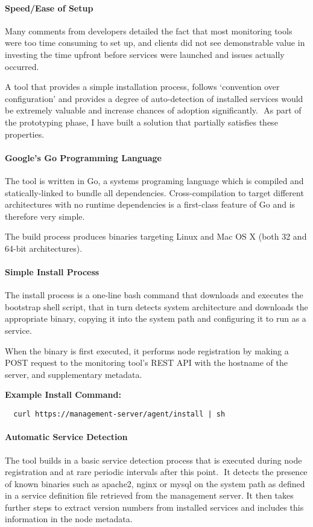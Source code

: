 \documentclass{cshonours}
\begin{document}
\paragraph{Speed/Ease of Setup} Many comments from developers detailed the fact that most monitoring tools were too time consuming to set up, and clients did not see demonstrable value in investing the time upfront before services were launched and issues actually occurred. 

A tool that provides a simple installation process, follows ‘convention over configuration’ and provides a degree of auto-detection of installed services would be extremely valuable and increase chances of adoption significantly.
 As part of the prototyping phase, I have built a solution that partially satisfies these properties.

\paragraph{Google's Go Programming Language} The tool is written in Go, a systems programing language which is compiled and statically-linked to bundle all dependencies. Cross-compilation to target different architectures with no runtime dependencies is a first-class feature of Go and is therefore very simple.

The build process produces binaries targeting Linux and Mac OS X (both 32 and 64-bit architectures). 

\paragraph{Simple Install Process} The install process is a one-line bash command that downloads and executes the bootstrap shell script, that in turn detects system architecture and downloads the appropriate binary, copying it into the system path and configuring it to run as a service.

When the binary is first executed, it performs node registration by making a POST request to the monitoring tool’s REST API with the hostname of the server, and supplementary metadata.

\textbf{Example Install Command:}
\begin{verbatim}
  curl https://management-server/agent/install | sh
\end{verbatim}

\paragraph{Automatic Service Detection} The tool builds in a basic service detection process that is executed during node registration and at rare periodic intervals after this point. 
 It detects the presence of known binaries such as apache2, nginx or mysql on the system path as defined in a service definition file retrieved from the management server. It then takes further steps to extract version numbers from installed services and includes this information in the node metadata.
\end{document}

